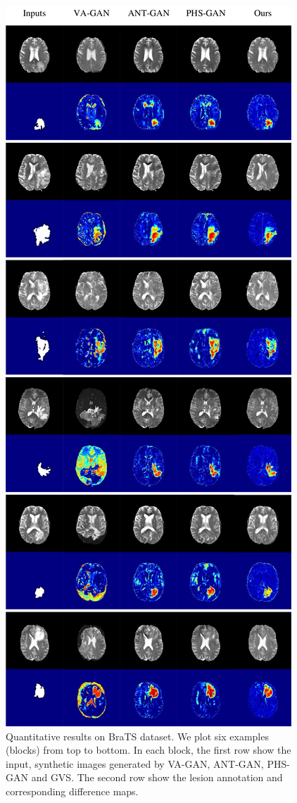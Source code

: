 \documentclass[journal,twoside,web]{ieeecolor}
\begin{document}
\begin{figure}[htbp]
	\centering
	\includegraphics[width=\columnwidth]{./figs/results.pdf}
	\caption{Quantitative results on BraTS dataset. We plot six examples (blocks) from top to bottom. In each block, the first row show the input, synthetic images generated by VA-GAN, ANT-GAN, PHS-GAN and GVS. The second row show the lesion annotation and corresponding difference maps.}
	\label{fig7}
\end{figure}
\end{document}
